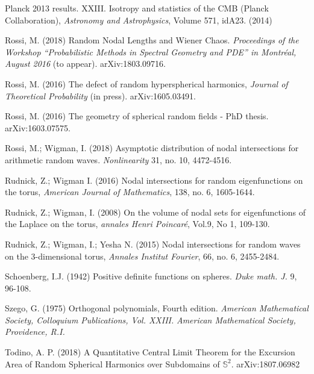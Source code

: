 \begin{thebibliography}{99}
	 Planck 2013 results. XXIII. Isotropy and statistics of the CMB (Planck Collaboration), \textit{Astronomy and Astrophysics},  Volume 571, idA23. (2014)
	
	 Rossi, M. (2018) Random Nodal Lengths and
	Wiener Chaos. \textit{Proceedings of the Workshop “Probabilistic Methods in Spectral Geometry and PDE” in Montréal, August 2016} (to appear). arXiv:1803.09716.
	
	 Rossi, M. (2016) The defect of random hyperspherical harmonics, \textit{Journal of Theoretical Probability} (in press). arXiv:1605.03491.
	
	
	 Rossi, M. (2016) The geometry of spherical random fields - PhD thesis. arXiv:1603.07575.
	
	
	

	
	 Rossi, M.; Wigman, I. (2018) Asymptotic distribution of nodal intersections for arithmetic random waves. \textit{Nonlinearity} 31, no. 10, 4472-4516. 
	
	
	
	 Rudnick, Z.; Wigman I. (2016) Nodal intersections for random
	eigenfunctions on the torus, \textit{American Journal of Mathematics}, 138, no. 6,
	1605-1644.
	
	 Rudnick, Z.; Wigman, I. (2008) On the volume of nodal sets for eigenfunctions of the Laplace on the torus, \textit{annales Henri Poincar\'e}, Vol.9, No 1, 109-130.
	
	 Rudnick, Z.; Wigman, I.; Yesha N. (2015) Nodal intersections for
	random waves on the 3-dimensional torus, \textit{Annales Institut Fourier}, 66, no.
	6, 2455-2484.
	
	Schoenberg, I.J. (1942) Positive definite functions on spheres. \textit{Duke math. J.} 9, 96-108.
	
	
	
	 Szego, G. (1975) Orthogonal polynomials, Fourth edition. \textit{%
		American Mathematical Society, Colloquium Publications, Vol. XXIII.} \textit{%
		American Mathematical Society, Providence, R.I.}
	
	 Todino, A. P. (2018) A Quantitative Central Limit Theorem for the Excursion Area of
	Random Spherical Harmonics over Subdomains of $\mathbb{S}^2$. arXiv:1807.06982
	

\end{thebibliography}
